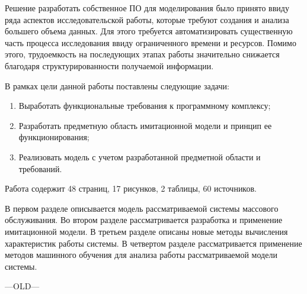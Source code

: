 Решение разработать собственное ПО для моделирования было принято ввиду ряда аспектов исследовательской работы, которые требуют создания и анализа большего объема данных. Для этого требуется автоматизировать существенную часть процесса исследования ввиду ограниченного времени и ресурсов. Помимо этого, трудоемкость на последующих этапах работы значительно снижается благодаря структурированности получаемой информации.

В рамках цели данной работы поставлены следующие задачи:
\begin{enumerate}
	\item Выработать функциональные требования к программному комплексу;
	\item Разработать предметную область имитационной модели и принцип ее функционирования;
	\item Реализовать модель с учетом разработанной предметной области и требований.
\end{enumerate}

Работа содержит 48 страниц, 17 рисунков, 2 таблицы, 60 источников.

В первом разделе описывается модель рассматриваемой системы массового обслуживания. Во втором разделе рассматривается разработка и применение имитационной модели. В третьем разделе описаны новые методы вычисления характеристик работы системы. В четвертом разделе рассматривается применение методов машинного обучения для анализа работы рассматриваемой модели системы.

---OLD---
 \clearpage
 